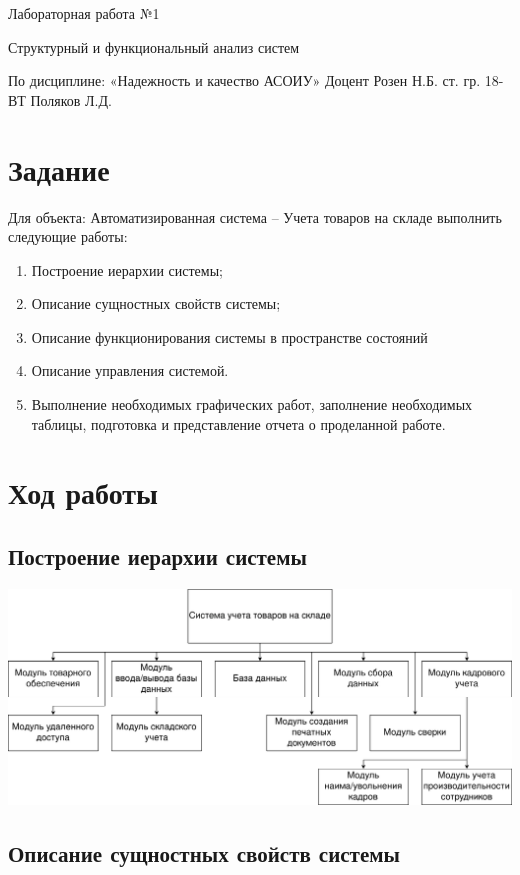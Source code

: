 \documentclass[14pt]{extarticle}
\let\oldsection\section
\renewcommand\section{\clearpage\oldsection}
\begin{document}
\unititle
{\klgtu}
{\fapu}
{\suvt}
{Лабораторная работа №1 \par Структурный и функциональный анализ систем}
{По дисциплине: «Надежность и качество АСОИУ»}
{Доцент}
{Розен Н.Б.}
{ст. гр. 18-ВТ}
{Поляков Л.Д.}

\tableofcontents

\section{Задание}

Для объекта: Автоматизированная система – Учета товаров на складе выполнить следующие работы:
\begin{enumerate}
	\item Построение иерархии системы;
	\item Описание сущностных свойств системы;
	\item Описание функционирования системы в пространстве состояний
	\item Описание управления системой.
	\item Выполнение необходимых графических работ, заполнение необходимых таблицы, подготовка и представление отчета о проделанной работе.
\end{enumerate}

\section{Ход работы}

\subsection{Построение иерархии системы}

\includegraphics[width=\textwidth]{MonitorF.drawio}

\subsection{Описание сущностных свойств системы}
\end{document}
